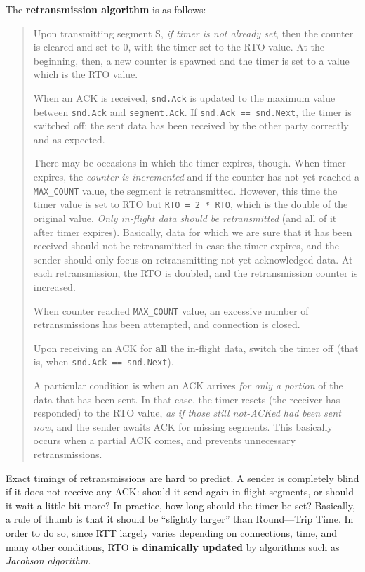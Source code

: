 \documentclass[10pt]{extbook}
\begin{document}
The \textbf{retransmission algorithm} is as follows:

\begin{quote}
    Upon transmitting segment S, \emph{if timer is not already set}, then the
    counter is cleared and set to $0$, with the timer set to the RTO value.
    At the beginning, then, a new counter is spawned and the timer is set to
    a value which is the RTO value.

    When an ACK is received, \texttt{snd.Ack} is updated to the maximum value
    between \texttt{snd.Ack} and \texttt{segment.Ack}. If \texttt{snd.Ack ==
    snd.Next}, the timer is switched off: the sent data has been received by
    the other party correctly and as expected.

    There may be occasions in which the timer expires, though.
    When timer expires, the \emph{counter is incremented} and if the counter
    has not yet reached a \texttt{MAX\_COUNT} value, the segment is
    retransmitted. However, this time the timer value is set to RTO but
    \texttt{RTO = 2 * RTO}, which is the double of the original value.
    \emph{Only in-flight data should be retransmitted} (and all of it after
    timer expires). Basically, data for which we are sure that it has been
    received should not be retransmitted in case the timer expires, and the
    sender should only focus on retransmitting not-yet-acknowledged data. At
    each retransmission, the RTO is doubled, and the retransmission counter is
    increased.

    When counter reached \texttt{MAX\_COUNT} value, an excessive number of
    retransmissions has been attempted, and connection is closed.

    Upon receiving an ACK for \textbf{all} the in-flight data, switch the timer
    off (that is, when \texttt{snd.Ack == snd.Next}).

    A particular condition is when an ACK arrives \emph{for only a portion} of
    the data that has been sent. In that case, the timer resets (the receiver
    has responded) to the RTO value, \emph{as if those still not-ACKed had been
    sent now}, and the sender awaits ACK for missing segments. This basically
    occurs when a partial ACK comes, and prevents unnecessary retransmissions.
\end{quote}

Exact timings of retransmissions are hard to predict. A sender is completely
blind if it does not receive any ACK: should it send again in-flight segments,
or should it wait a little bit more? In practice, how long should the timer be
set? Basically, a rule of thumb is that it should be ``slightly larger'' than
Round\----Trip Time. In order to do so, since RTT largely varies depending on
connections, time, and many other conditions, RTO is \textbf{dinamically updated}
by algorithms such as \emph{Jacobson algorithm}.
\end{document}
